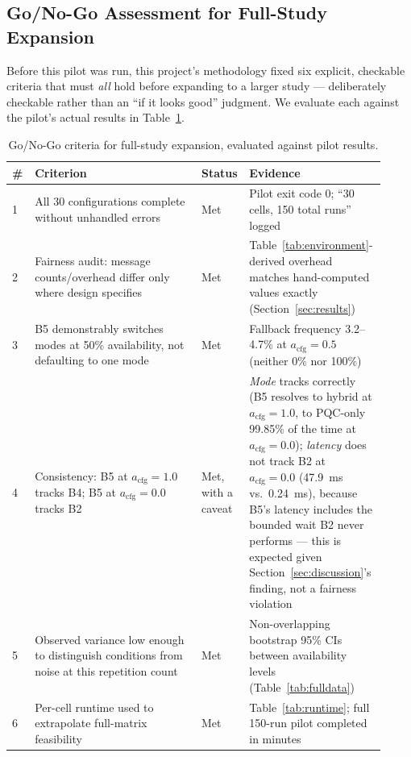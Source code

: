 \documentclass[journal]{IEEEtran}
\newcommand{\acfg}{\ensuremath{a_{\text{cfg}}}}
\begin{document}
\subsection{Go/No-Go Assessment for Full-Study Expansion}
\label{sec:gonogo}

Before this pilot was run, this project's methodology fixed six explicit, checkable criteria that must \emph{all} hold before expanding to a larger study --- deliberately checkable rather than an ``if it looks good'' judgment. We evaluate each against the pilot's actual results in Table~\ref{tab:gonogo}.

\begin{table}[t]
\centering
\caption{Go/No-Go criteria for full-study expansion, evaluated against pilot results.}
\label{tab:gonogo}
\small
\begin{tabular}{@{}p{0.06\linewidth}p{0.44\linewidth}p{0.10\linewidth}p{0.32\linewidth}@{}}
\toprule
\# & Criterion & Status & Evidence \\
\midrule
1 & All 30 configurations complete without unhandled errors & Met & Pilot exit code 0; ``30 cells, 150 total runs'' logged \\
2 & Fairness audit: message counts/overhead differ only where design specifies & Met & Table~\ref{tab:environment}-derived overhead matches hand-computed values exactly (Section~\ref{sec:results}) \\
3 & B5 demonstrably switches modes at 50\% availability, not defaulting to one mode & Met & Fallback frequency 3.2--4.7\% at $\acfg=0.5$ (neither 0\% nor 100\%) \\
4 & Consistency: B5 at $\acfg=1.0$ tracks B4; B5 at $\acfg=0.0$ tracks B2 & Met, with a caveat & \emph{Mode} tracks correctly (B5 resolves to hybrid at $\acfg=1.0$, to PQC-only 99.85\% of the time at $\acfg=0.0$); \emph{latency} does not track B2 at $\acfg=0.0$ (\qty{47.9}{ms} vs.\ \qty{0.24}{ms}), because B5's latency includes the bounded wait B2 never performs --- this is expected given Section~\ref{sec:discussion}'s finding, not a fairness violation \\
5 & Observed variance low enough to distinguish conditions from noise at this repetition count & Met & Non-overlapping bootstrap 95\% CIs between availability levels (Table~\ref{tab:fulldata}) \\
6 & Per-cell runtime used to extrapolate full-matrix feasibility & Met & Table~\ref{tab:runtime}; full 150-run pilot completed in minutes \\
\bottomrule
\end{tabular}
\end{table}
\end{document}
